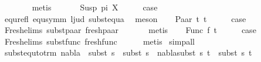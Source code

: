 \begin{isabellebody}
\ \ \ \ \ \ \isamarkupfalse%
\ metis\isanewline
\ \ \isamarkupfalse%
\isanewline
{}\isamarkupfalse%
\isanewline
\ \ \isamarkupfalse%
\ {\isacharparenleft}{\kern0pt}Susp\ pi\ X{\isacharparenright}{\kern0pt}\isanewline
\ \ \isamarkupfalse%
\ \isamarkupfalse%
\ {\isacharquery}{\kern0pt}case\isanewline
\ \ \ \ \isamarkupfalse%
\ equ{\isacharunderscore}{\kern0pt}refl\ equ{\isacharunderscore}{\kern0pt}symm\ l{}{\isacharunderscore}{\kern0pt}jud\ subst{\isacharunderscore}{\kern0pt}equ{\isacharunderscore}{\kern0pt}a\ \isamarkupfalse%
\ meson\isanewline
{}\isamarkupfalse%
\isanewline
\ \ \isamarkupfalse%
\ {\isacharparenleft}{\kern0pt}Paar\ t{}\ t{}{\isacharparenright}{\kern0pt}\isanewline
\ \ \isamarkupfalse%
\ \isamarkupfalse%
\ {\isacharquery}{\kern0pt}case\ \isanewline
\ \ \ \ \isamarkupfalse%
\ Fresh{\isacharunderscore}{\kern0pt}elims{\isacharparenleft}{\kern0pt}{}{\isacharparenright}{\kern0pt}\ subst{\isacharunderscore}{\kern0pt}paar\ fresh{\isacharunderscore}{\kern0pt}paar\ \isanewline
\ \ \ \ \isamarkupfalse%
\ metis\isanewline
{}\isamarkupfalse%
\isanewline
\ \ \isamarkupfalse%
\ {\isacharparenleft}{\kern0pt}Func\ f\ t{\isacharprime}{\kern0pt}{\isacharparenright}{\kern0pt}\isanewline
\ \ \isamarkupfalse%
\ \isamarkupfalse%
\ {\isacharquery}{\kern0pt}case\isanewline
\ \ \ \ \isamarkupfalse%
\ Fresh{\isacharunderscore}{\kern0pt}elims{\isacharparenleft}{\kern0pt}{}{\isacharparenright}{\kern0pt}\ subst{\isacharunderscore}{\kern0pt}func\ fresh{\isacharunderscore}{\kern0pt}func\isanewline
\ \ \ \ \isamarkupfalse%
\ metis\isanewline
{}\isamarkupfalse%
\ {\isacharparenleft}{\kern0pt}simp{\isacharunderscore}{\kern0pt}all{\isacharparenright}{\kern0pt}%
\endisatagproof
{\isafoldproof}%
%
\isadelimproof
\isanewline
%
\endisadelimproof
\isanewline
{}\isamarkupfalse%
\ subst{\isacharunderscore}{\kern0pt}equ{\isacharunderscore}{\kern0pt}to{\isacharunderscore}{\kern0pt}trm{\isacharcolon}{\kern0pt}\ {\isachardoublequoteopen}nabla\ {\isasymTurnstile}\ subst\ s{}\ {\isasymapprox}\ subst\ s{}\ {\isasymLongrightarrow}\ nabla{\isasymturnstile}subst\ s{}\ t\ {\isasymapprox}\ subst\ s{}\ t{\isachardoublequoteclose}\isanewline

\end{isabellebody}
